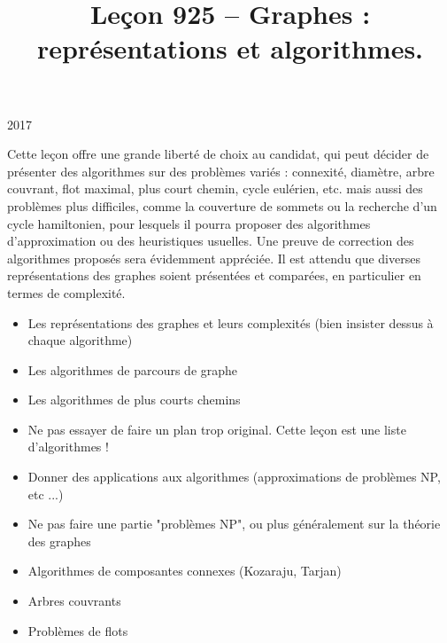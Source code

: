 \documentclass{agregfiche}
\title{Leçon 925 -- Graphes : représentations et algorithmes.}
\begin{document}
\maketitle

\secrapports

\begin{rapport}{2017}

Cette leçon offre une grande liberté de choix au candidat, qui peut décider de présenter des algorithmes sur des problèmes variés : connexité, diamètre, arbre couvrant, flot maximal, plus court chemin, cycle eulérien, etc. mais aussi des problèmes plus difficiles, comme la couverture de sommets ou la recherche d’un cycle hamiltonien, pour lesquels il pourra proposer des algorithmes d’approximation ou des heuristiques usuelles. Une preuve de correction des algorithmes proposés sera évidemment appréciée. Il est attendu que diverses représentations des graphes soient présentées et comparées, en particulier en termes de complexité.

\end{rapport}

\secindispensables

\begin{itemize}
    \item Les représentations des graphes et leurs complexités
        (bien insister dessus à chaque algorithme)
    \item Les algorithmes de parcours de graphe
    \item Les algorithmes de plus courts chemins
\end{itemize}

\secpieges

\begin{itemize}
    \item Ne pas essayer de faire un plan trop original. Cette leçon est une
        liste d'algorithmes !
    \item Donner des applications aux algorithmes (approximations de problèmes
        NP, etc ...)
    \item Ne pas faire une partie "problèmes NP", ou plus généralement 
        sur la théorie des graphes
\end{itemize}

\secidees

\begin{itemize}
    \item Algorithmes de composantes connexes (Kozaraju, Tarjan)
    \item Arbres couvrants
    \item Problèmes de flots
\end{itemize}
\end{document}
